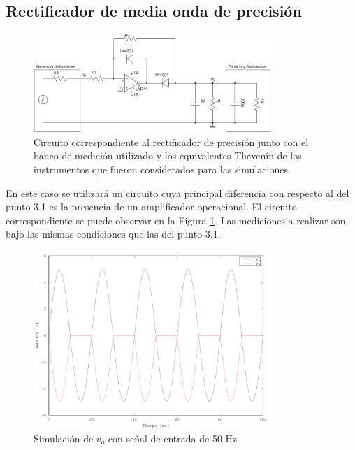 \subsection{Rectificador de media onda de precisión}
\begin{figure}[H]
  \centering
      \includegraphics[width=0.8\textwidth]{gfxsantiago/FIG_CIRC_Rectificador_Precision_B.pdf}
  \caption{Circuito correspondiente al rectificador de precisión junto con el banco de medición utilizado y los equivalentes Thevenin de los instrumentos que fueron considerados para las simulaciones.}
  \label{fig:circ_4A}
\end{figure}
En este caso se utilizará un circuito cuya principal diferencia con respecto al del punto 3.1 es la presencia de un amplificador operacional. El circuito correspondiente se puede observar en la Figura \ref{fig:circ_4A}. Las mediciones a realizar son bajo las mismas condiciones que las del punto 3.1.\\

\begin{figure}[H]
  \centering
      \includegraphics[width=0.8\textwidth]{gfxsantiago/FIG_SIM_Rectificador_Precision_4A1.png}
  \caption{Simulación de $v_{o}$ con señal de entrada de 50 Hz}
\end{figure}

